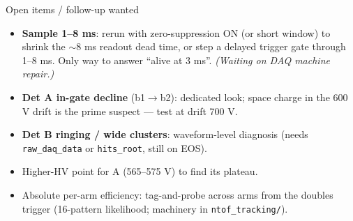 \documentclass[aspectratio=169,10pt]{beamer}
\begin{document}
\begin{frame}{Open items / follow-up wanted}
\begin{itemize}
\item \textbf{Sample 1--8 ms}: rerun with zero-suppression ON (or short
      window) to shrink the $\sim$8 ms readout dead time, or step a delayed
      trigger gate through 1--8 ms. Only way to answer ``alive at 3 ms''.
      \emph{(Waiting on DAQ machine repair.)}
\item \textbf{Det A in-gate decline} (b1$\to$b2): dedicated look; space
      charge in the 600 V drift is the prime suspect --- test at drift 700 V.
\item \textbf{Det B ringing / wide clusters}: waveform-level diagnosis
      (needs \texttt{raw\_daq\_data} or \texttt{hits\_root}, still on EOS).
\item Higher-HV point for A (565--575 V) to find its plateau.
\item Absolute per-arm efficiency: tag-and-probe across arms from the
      doubles trigger (16-pattern likelihood; machinery in
      \texttt{ntof\_tracking/}).
\end{itemize}
\end{frame}
\end{document}
